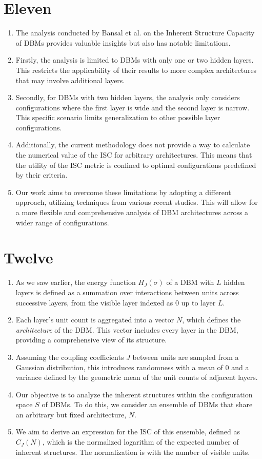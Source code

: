 \documentclass{article}
\begin{document}
\section*{Eleven}
\begin{enumerate}
    \item The analysis conducted by Bansal et al. on the Inherent Structure Capacity of DBMs provides valuable insights but also has notable limitations.
    \item Firstly, the analysis is limited to DBMs with only one or two hidden layers. This restricts the applicability of their results to more complex architectures that may involve additional layers.
    \item Secondly, for DBMs with two hidden layers, the analysis only considers configurations where the first layer is wide and the second layer is narrow. This specific scenario limits generalization to other possible layer configurations.
    \item Additionally, the current methodology does not provide a way to calculate the numerical value of the ISC for arbitrary architectures. This means that the utility of the ISC metric is confined to optimal configurations predefined by their criteria.
    \item Our work aims to overcome these limitations by adopting a different approach, utilizing techniques from various recent studies. This will allow for a more flexible and comprehensive analysis of DBM architectures across a wider range of configurations.
\end{enumerate}

\section*{Twelve}
\begin{enumerate}
    \item As we saw earlier, the energy function \( H_J(\sigma) \) of a DBM with \( L \) hidden layers is defined as a summation over interactions between units across successive layers, from the visible layer indexed as 0 up to layer \( L \).
    \item Each layer's unit count is aggregated into a vector \( N \), which defines the \emph{architecture} of the DBM. This vector includes every layer in the DBM, providing a comprehensive view of its structure.
    \item Assuming the coupling coefficients \( J \) between units are sampled from a Gaussian distribution, this introduces randomness with a mean of 0 and a variance defined by the geometric mean of the unit counts of adjacent layers.
    \item Our objective is to analyze the inherent structures within the configuration space \( S \) of DBMs. To do this, we consider an ensemble of DBMs that share an arbitrary but fixed architecture, \( N \).
    \item We aim to derive an expression for the ISC of this ensemble, defined as \( C_J(N) \), which is the normalized logarithm of the expected number of inherent structures. The normalization is with the number of visible units.
\end{enumerate}
\end{document}
